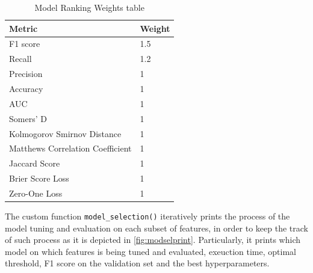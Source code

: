 \begin{table}[H]
    \small
    \setlength{\tabcolsep}{8pt}
    \renewcommand{\arraystretch}{1.3}
    \centering
        \caption[Model Ranking Weights table]{Model Ranking Weights table}\label{tab:weightsrank}
        \begin{tabular}{ll}
    \toprule
    \textbf{Metric} & \textbf{Weight}\\
    \midrule
    \hline
    F1 score & 1.5 \\
    Recall & 1.2 \\
    Precision & 1 \\
    Accuracy & 1 \\
    AUC & 1 \\
    Somers' D & 1 \\ 
    Kolmogorov Smirnov Distance  & 1 \\
    Matthews Correlation Coefficient  & 1 \\
    Jaccard Score  & 1 \\
    Brier Score Loss  & 1 \\
    Zero-One Loss  & 1 \\
    \hline
    \bottomrule
    \end{tabular}
    \vspace{0.7em}

    \vspace{-1em}
\end{table}



The custom function \lstinline{model_selection()} iteratively prints the process of the model tuning and evaluation on each subset of features, in order to keep the track of such process as it is depicted in \autoref{fig:modselprint}.
Particularly, it prints which model on which features is being tuned and evaluated, exeuction time, optimal threshold, F1 score on the validation set and the best hyperparameters.

